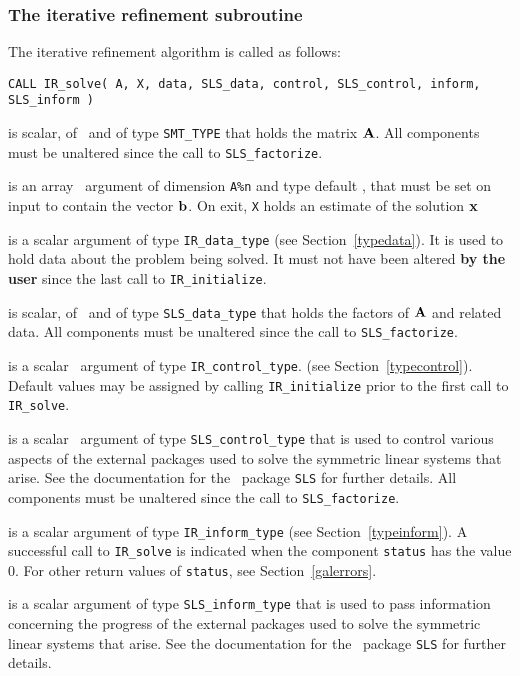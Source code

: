 \documentclass{galahad}
\newcommand{\packagename}{IR}
\begin{document}

\subsubsection{The iterative refinement subroutine}
The iterative refinement algorithm is called as follows:

\hskip0.5in
{\tt CALL \packagename\_solve( A, X, data, SLS\_data, control, SLS\_control,  inform, SLS\_inform )}

\begin{description}

 is scalar, of \intentin\ and of type {\tt SMT\_TYPE} that holds
the matrix ${\mathbf{A}}$.  All components must be unaltered since the call
to {\tt SLS\_factorize}.

 is an array \intentinout\ argument of dimension {\tt A\%n} and
type default \realdp, that must be set on input to contain the vector ${\mathbf{b}}$.
On exit, {\tt X} holds an estimate of the solution ${\mathbf{x}}$

 is a scalar \intentinout argument of type
{\tt \packagename\_data\_type}
(see Section~\ref{typedata}). It is used to hold data about the problem being
solved. It must not have been altered {\bf by the user} since the last call to
{\tt \packagename\_initialize}.

 is scalar, of \intentinout\ and of type {\tt SLS\_data\_type}
that holds the factors of ${\mathbf{A}}$ and related data.
All components must be unaltered since the call to {\tt SLS\_factorize}.

 is a scalar \intentin\ argument of type
{\tt \packagename\_control\_type}.
(see Section~\ref{typecontrol}).
Default values may be assigned by calling {\tt \packagename\_initialize}
prior to the first call to {\tt \packagename\_solve}.

 is a scalar \intentin\ argument of type
{\tt SLS\_control\_type} that is used to control various aspects of the
external packages used to solve the symmetric linear systems that arise.
See the documentation for the \galahad\ package {\tt SLS} for further details.
All components must be unaltered since the call to {\tt SLS\_factorize}.

 is a scalar \intentinout argument of type
{\tt \packagename\_inform\_type}
(see Section~\ref{typeinform}).
A successful call to
{\tt \packagename\_solve}
is indicated when the  component {\tt status} has the value 0.
For other return values of {\tt status}, see Section~\ref{galerrors}.

 is a scalar \intentinout argument of type
{\tt SLS\_inform\_type} that is used to pass information
concerning the progress of the external packages used to solve the symmetric
linear systems that arise.
See the documentation for the \galahad\ package {\tt SLS} for further details.

\end{description}
\end{document}
